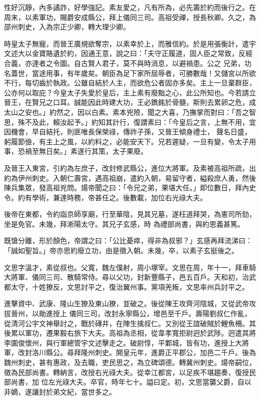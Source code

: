 \begin{pinyinscope}
 性好沉靜，內多譎詐，好學強記。素友愛之，凡有所為，必先籌於約而後行之。在周末，以素軍功，賜爵安成縣公，拜上儀同三司。高祖受禪，授長秋卿。久之，為邵州刺史，入為宗正少卿，轉大理少卿。



 時皇太子無寵，而晉王廣規欲奪宗，以素幸於上，而雅信約。於是用張衡計，遣宇文述大以金寶賂遺於約，因通王意，說之曰：「夫守正履道，固人臣之常致，反經合義，亦達者之令圖。自古賢人君子，莫不與時消息，以避禍患。公之
 兄弟，功名蓋世，當途用事，有年歲矣。朝臣為足下家所屈辱者，可勝數哉！又儲宮以所欲不行，每切齒於執政。公雖自結於人主，而欲危公者固亦多矣。主上一旦棄群臣，公亦何以取庇？今皇太子失愛於皇后，主上素有廢黜之心，此公所知也。今若請立晉王，在賢兄之口耳。誠能因此時建大功，王必鐫銘於骨髓，斯則去累卵之危，成太山之安也。」約然之，因以白素。素本兇險，聞之大喜，乃撫掌而對曰：「吾之智思，殊不及此，賴汝起予。」約知其計行，復謂素曰：「今皇后之言，上無不用，宜因機會，早自結托，則匪唯長保榮祿，傳祚子孫，又晉王傾身禮士，
 聲名日盛，躬履節儉，有主上之風，以約料之，必能安天下。兄若遲疑，一旦有變，令太子用事，恐禍至無日矣。」素遂行其策，太子果廢。



 及晉王入東宮，引約為左庶子，改封修武縣公，進位大將軍。及素被高祖所疏，出約為伊州刺史。入朝仁壽宮，遇高祖崩，遣約入朝，易留守者，縊殺庶人勇，然後陳兵集眾，發高祖兇問。煬帝聞之曰：「令兄之弟，果堪大任。」即位數日，拜內史令。約有學術，兼達時務，帝甚任之。後數載，加位右光祿大夫。



 後帝在東都，令約詣京師享廟，行至華陰，見其兄墓，遂枉道拜哭，為憲司所劾，坐是免官。未幾，拜淅陽太守。其兄子玄感，時
 為禮部尚書，與約恩義甚篤。



 既愴分離，形於顏色，帝謂之曰：「公比憂瘁，得非為叔邪？」玄感再拜流涕曰：「誠如聖旨。」帝亦思約廢立功，由是徵入朝。未幾，卒，以素子玄挺後之。



 文思字溫才，素從叔也。父寬，魏左僕射，周小塚宰。文思在周，年十一，拜車騎大將軍、儀同三司、散騎常侍。尋以父功，封新豐縣子，邑五百戶。天和初，治武都太守，十姓獠反，文思討平之，復治翼州事。黨項羌叛，文思率州兵討平之。



 進擊資中、武康、隆山生獠及東山獠，並破之。後從陳王攻齊河陰城，又從武帝攻拔晉州，以勛進授上
 儀同三司，改封永寧縣公，增邑至千戶。壽陽劉叔仁作亂，從清河公宇文神舉討之，戰於磚井，在陣生擒叔仁。又別從王誼破賊於鯉魚柵。其後累以軍功，遷果毅右旅下大夫。高祖為丞相，從韋孝寬拒尉迥於武陟。迥遣其將李圍俊懷州，與行軍總管宇文述擊走之。破尉惇，平鄴城，皆有功，進授上大將軍，改封洛川縣公。尋拜隆州刺史。開皇元年，進爵正平郡公，加邑二千戶。後為魏州刺史，甚有惠政，及去職，吏民思之，為立碑頌德。轉冀州刺史。煬帝嗣位，徵為民部尚書。轉納言，改授右光祿大夫。從幸江都宮，以足疾不堪趨奏，復授民部尚書，加
 位左光祿大夫。卒官，時年七十。謚曰定。初，文思當襲父爵，自以非嫡，遂讓封於弟文紀，當世多之。




\end{pinyinscope}
